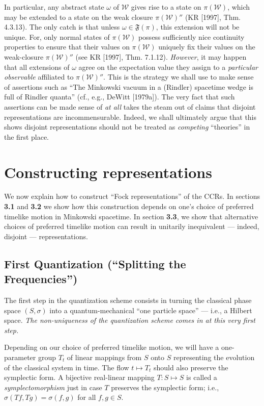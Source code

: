 \documentclass[12pt]{article}
\theoremstyle{remark}
\theoremstyle{definition}
\newcommand{\alg}[1]{\mathcal{#1}}
\begin{document}
In particular, any abstract state $\omega$ of $\alg{W}$ gives rise to
a state on $\pi(\alg{W})$, which may be extended to a state on the
weak closure $\pi(\alg{W})''$ (KR [1997], Thm.  4.3.13).  The only
catch is that unless $\omega \in \mathfrak{F}(\pi )$, this extension
will not be unique.  For, only normal states of $\pi (\alg{W})$
possess sufficiently nice continuity properties to ensure that their
values on $\pi(\alg{W})$ uniquely fix their values on the weak-closure
$\pi(\alg{W})''$ (see KR [1997], Thm. 7.1.12).  \emph{However}, it may
happen that all extensions of $\omega$ agree on the expectation value
they assign to a \emph{particular observable} affiliated to
$\pi(\alg{W})''$. This is the strategy we shall use to make sense of
assertions such as ``The Minkowski vacuum in a (Rindler) spacetime
wedge is full of Rindler quanta'' (cf., e.g., DeWitt [1979a]).  The
very fact that such assertions can be made sense of \emph{at all}
takes the steam out of claims that disjoint representations are
incommensurable.  Indeed, we shall ultimately argue that this shows
disjoint representations should not be treated as \emph{competing}
``theories'' in the first place.
 
\section{Constructing representations}
We now explain how to construct ``Fock representations'' of the CCRs.
In sections \textbf{3.1} and \textbf{3.2} we
 show how this construction depends on one's choice of
preferred timelike motion in Minkowski spacetime.  In section 
\textbf{3.3}, we show that alternative choices of preferred
timelike motion can result in unitarily inequivalent --- indeed,
disjoint --- representations.

\subsection{First Quantization (``Splitting the Frequencies'')}
The first step in the quantization scheme consists in turning the
classical phase space $(S,\sigma)$ into a quantum-mechanical ``one
particle space'' --- i.e., a Hilbert space.  \emph{The non-uniqueness
of the quantization scheme comes in at this very first step.}  

Depending on our choice of preferred timelike motion, we will have a
one-parameter group $T_{t}$ of linear mappings from $S$ onto $S$
representing the evolution of the classical system in time.  The flow
$t\mapsto T_{t}$ should also preserve the symplectic form.  A
bijective real-linear mapping $T:S\mapsto S$ is called a
\emph{symplectomorphism} just in case $T$ preserves the symplectic
form; i.e., $\sigma (Tf,Tg)=\sigma (f,g)$ for all $f,g\in S$.
\end{document}
